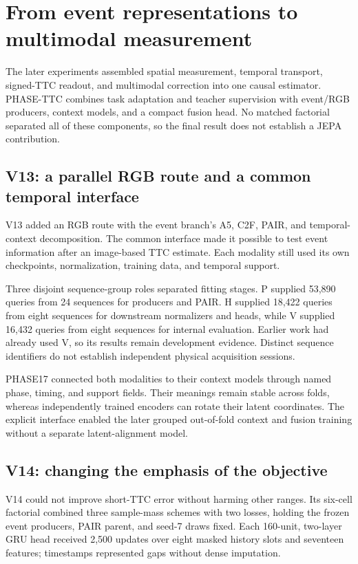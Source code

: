 \section{From event representations to multimodal measurement}
\label{sec:late}

The later experiments assembled spatial measurement, temporal transport, signed-TTC readout, and multimodal correction into one causal estimator. PHASE-TTC combines task adaptation and teacher supervision with event/RGB producers, context models, and a compact fusion head. No matched factorial separated all of these components, so the final result does not establish a JEPA contribution.

\subsection{V13: a parallel RGB route and a common temporal interface}

V13 added an RGB route with the event branch's A5, C2F, PAIR, and temporal-context decomposition. The common interface made it possible to test event information after an image-based TTC estimate. Each modality still used its own checkpoints, normalization, training data, and temporal support.

Three disjoint sequence-group roles separated fitting stages. P supplied 53,890 queries from 24 sequences for producers and PAIR. H supplied 18,422 queries from eight sequences for downstream normalizers and heads, while V supplied 16,432 queries from eight sequences for internal evaluation. Earlier work had already used V, so its results remain development evidence. Distinct sequence identifiers do not establish independent physical acquisition sessions. 

PHASE17 connected both modalities to their context models through named phase, timing, and support fields. Their meanings remain stable across folds, whereas independently trained encoders can rotate their latent coordinates. The explicit interface enabled the later grouped out-of-fold context and fusion training without a separate latent-alignment model.

\subsection{V14: changing the emphasis of the objective}

V14 could not improve short-TTC error without harming other ranges. Its six-cell factorial combined three sample-mass schemes with two losses, holding the frozen event producers, PAIR parent, and seed-7 draws fixed. Each 160-unit, two-layer GRU head received 2,500 updates over eight masked history slots and seventeen features; timestamps represented gaps without dense imputation.

